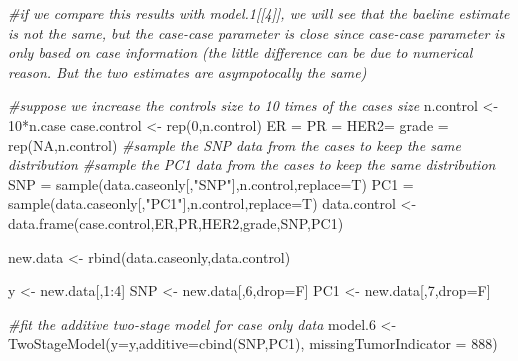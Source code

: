 \documentclass[11pt,]{article}
\newenvironment{Shaded}{\begin{snugshade}}{\end{snugshade}}
\newcommand{\AttributeTok}[1]{\textcolor[rgb]{0.77,0.63,0.00}{#1}}
\newcommand{\CommentTok}[1]{\textcolor[rgb]{0.56,0.35,0.01}{\textit{#1}}}
\newcommand{\ConstantTok}[1]{\textcolor[rgb]{0.00,0.00,0.00}{#1}}
\newcommand{\DecValTok}[1]{\textcolor[rgb]{0.00,0.00,0.81}{#1}}
\newcommand{\FloatTok}[1]{\textcolor[rgb]{0.00,0.00,0.81}{#1}}
\newcommand{\FunctionTok}[1]{\textcolor[rgb]{0.00,0.00,0.00}{#1}}
\newcommand{\NormalTok}[1]{#1}
\newcommand{\OtherTok}[1]{\textcolor[rgb]{0.56,0.35,0.01}{#1}}
\newcommand{\SpecialCharTok}[1]{\textcolor[rgb]{0.00,0.00,0.00}{#1}}
\newcommand{\StringTok}[1]{\textcolor[rgb]{0.31,0.60,0.02}{#1}}
\begin{document}
\begin{Shaded}
\begin{Highlighting}[]
\CommentTok{\#if we compare this results with model.1[[4]], we will see that the baeline estimate is not the same, but the case{-}case parameter is close since case{-}case parameter is only based on case information (the little difference can be due to numerical reason. But the two estimates are asympotocally the same)}

\CommentTok{\#suppose we increase the controls size to 10 times of the cases size}
\NormalTok{n.control }\OtherTok{\textless{}{-}} \DecValTok{10}\SpecialCharTok{*}\NormalTok{n.case}
\NormalTok{case.control }\OtherTok{\textless{}{-}} \FunctionTok{rep}\NormalTok{(}\DecValTok{0}\NormalTok{,n.control)}
\NormalTok{ER }\OtherTok{=}\NormalTok{ PR }\OtherTok{=}\NormalTok{ HER2}\OtherTok{=}\NormalTok{ grade }\OtherTok{=} \FunctionTok{rep}\NormalTok{(}\ConstantTok{NA}\NormalTok{,n.control)}
\CommentTok{\#sample the SNP data from the cases to keep the same distribution}
\CommentTok{\#sample the PC1 data from the cases to keep the same distribution}
\NormalTok{SNP }\OtherTok{=} \FunctionTok{sample}\NormalTok{(data.caseonly[,}\StringTok{"SNP"}\NormalTok{],n.control,}\AttributeTok{replace=}\NormalTok{T)}
\NormalTok{PC1 }\OtherTok{=} \FunctionTok{sample}\NormalTok{(data.caseonly[,}\StringTok{"PC1"}\NormalTok{],n.control,}\AttributeTok{replace=}\NormalTok{T)}
\NormalTok{data.control }\OtherTok{\textless{}{-}} \FunctionTok{data.frame}\NormalTok{(case.control,ER,PR,HER2,grade,SNP,PC1)}

\NormalTok{new.data }\OtherTok{\textless{}{-}} \FunctionTok{rbind}\NormalTok{(data.caseonly,data.control)}

\NormalTok{y }\OtherTok{\textless{}{-}}\NormalTok{ new.data[,}\DecValTok{1}\SpecialCharTok{:}\DecValTok{4}\NormalTok{]}
\NormalTok{SNP }\OtherTok{\textless{}{-}}\NormalTok{ new.data[,}\DecValTok{6}\NormalTok{,drop}\OtherTok{=}\NormalTok{F]}
\NormalTok{PC1 }\OtherTok{\textless{}{-}}\NormalTok{ new.data[,}\DecValTok{7}\NormalTok{,drop}\OtherTok{=}\NormalTok{F]}

\CommentTok{\#fit the additive two{-}stage model for case only data}
\NormalTok{model}\FloatTok{.6} \OtherTok{\textless{}{-}} \FunctionTok{TwoStageModel}\NormalTok{(}\AttributeTok{y=}\NormalTok{y,}\AttributeTok{additive=}\FunctionTok{cbind}\NormalTok{(SNP,PC1),}
                         \AttributeTok{missingTumorIndicator =} \DecValTok{888}\NormalTok{)}
\end{Highlighting}
\end{Shaded}
\end{document}
